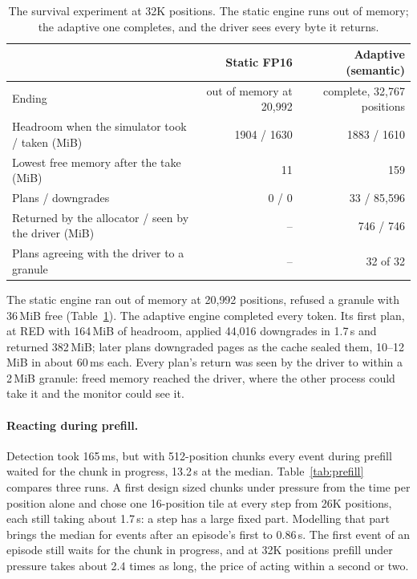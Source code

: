 \documentclass{article}
\begin{document}
\begin{table}[t]
\caption{The survival experiment at 32K positions. The static engine runs out
of memory; the adaptive one completes, and the driver sees every byte it
returns.}
\label{tab:survival}
\centering
\small
\begin{tabular}{lrr}
\toprule
& Static FP16 & Adaptive (semantic) \\
\midrule
Ending & out of memory at 20{,}992 & complete, 32{,}767 positions \\
Headroom when the simulator took / taken (MiB) & 1904 / 1630 & 1883 / 1610 \\
Lowest free memory after the take (MiB) & 11 & 159 \\
Plans / downgrades & 0 / 0 & 33 / 85{,}596 \\
Returned by the allocator / seen by the driver (MiB) & -- & 746 / 746 \\
Plans agreeing with the driver to a granule & -- & 32 of 32 \\
\bottomrule
\end{tabular}
\end{table}

The static engine ran out of memory at 20{,}992 positions, refused a granule
with 36\,MiB free (Table~\ref{tab:survival}). The adaptive engine completed
every token. Its first plan, at RED with 164\,MiB of headroom, applied 44{,}016
downgrades in 1.7\,s and returned 382\,MiB; later plans downgraded pages as the
cache sealed them, 10--12\,MiB in about 60\,ms each. Every plan's return was
seen by the driver to within a 2\,MiB granule: freed memory reached the driver,
where the other process could take it and the monitor could see it.

\paragraph{Reacting during prefill.} Detection took 165\,ms, but with
512-position chunks every event during prefill waited for the chunk in
progress, 13.2\,s at the median. Table~\ref{tab:prefill} compares three runs.
A first design sized chunks under pressure from the time per position alone
and chose one 16-position tile at every step from 26K positions, each still
taking about 1.7\,s: a step has a large fixed part. Modelling that part brings
the median for events after an episode's first to 0.86\,s. The first event of
an episode still waits for the chunk in progress, and at 32K positions prefill
under pressure takes about 2.4 times as long, the price of acting within a
second or two.
\end{document}
